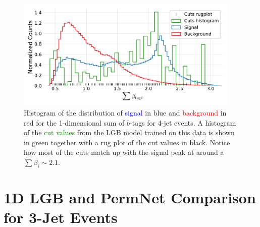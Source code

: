 \begin{figure}
  \includegraphics[width=0.95\textwidth, trim=10 10 10 20, clip]{figures/quarks/gtag_sum_method_njet=4-down_sample=1.00-ML_vars=vertex-selection=b-ejet_min=4-n_iter_RS_lgb=99-n_iter_RS_xgb=9-cdot_cut=0.90-version=19.pdf}
  \vspace{-0.7cm}
  \caption[1D LGB Model Cuts for 4-jets events]
          {Histogram of the distribution of \textcolor{blue}{signal} in blue and \textcolor{red}{background} in red for the 1-dimensional sum of $b$-tags for 4-jet events. A histogram of the \textcolor{green}{cut values} from the LGB model trained on this data is shown in green together with a rug plot of the cut values in black. Notice how most of the cuts match up with the signal peak at around a $\sum \beta_i \sim 2.1$.
          } 
  \label{fig:q:1d_sum_model_cuts_4j}
\end{figure}
\clearpage


\FloatBarrier
\section{1D LGB and PermNet Comparison for 3-Jet Events}

